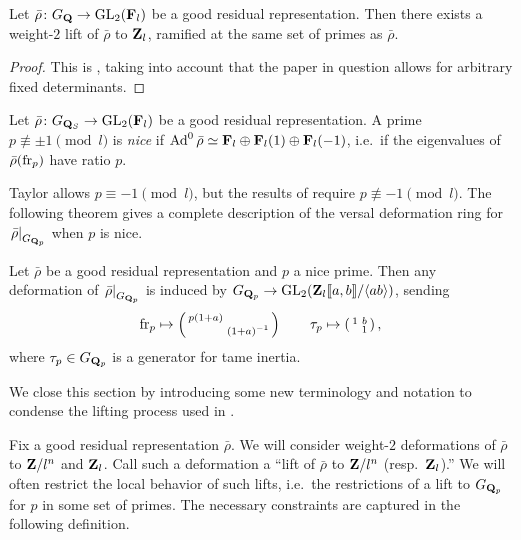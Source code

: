 \begin{theorem}\label{thm:always-can-lift}
Let $\bar\rho\colon G_{\mathbf{Q}} \to \operatorname{GL}_2(\mathbf{F}_l)$ be a good residual 
representation. Then there exists a weight-$2$ lift of $\bar\rho$ to $\mathbf{Z}_l$, 
ramified at the same set of primes as $\bar\rho$. 
\end{theorem}
\begin{proof}
This is \cite[Th.~1]{ramakrishna-2002}, taking into account that the paper in 
question allows for arbitrary fixed determinants. 
\end{proof}

\begin{definition}
Let $\bar\rho\colon G_{\mathbf{Q}_S} \to \operatorname{GL}_2(\mathbf{F}_l)$ be a good residual 
representation. A prime $p\not\equiv \pm 1\pmod l$ is \emph{nice} if 
$\operatorname{Ad}^0\bar\rho\simeq \mathbf{F}_l \oplus \mathbf{F}_l(1)\oplus \mathbf{F}_l(-1)$, i.e.~if the 
eigenvalues of $\bar\rho(\mathrm{fr}_p)$ have ratio $p$. 
\end{definition}

Taylor allows $p\equiv -1\pmod l$, but the results of \cite{pande-2011} 
require $p\not\equiv -1\pmod l$. The following theorem gives a complete 
description of the versal deformation ring for 
$\left.\bar\rho\right|_{G_{\mathbf{Q}_p}}$ when $p$ is nice.

\begin{theorem}
Let $\bar\rho$ be a good residual representation and $p$ a nice prime. Then 
any deformation of $\left.\bar\rho\right|_{G_{\mathbf{Q}_p}}$ is induced by 
$G_{\mathbf{Q}_p} \to \operatorname{GL}_2(\mathbf{Z}_l\llbracket a,b\rrbracket / \langle a b\rangle)$, sending 
\[
	\mathrm{fr}_p \mapsto \left(\begin{smallmatrix} p(1+a) &  \\  & (1+a)^{-1} \end{smallmatrix}\right) \qquad \tau_p \mapsto \left(\begin{smallmatrix} 1 & b \\  & 1 \end{smallmatrix}\right) ,
\]
where $\tau_p\in G_{\mathbf{Q}_p}$ is a generator for tame inertia. 
\end{theorem}

We close this section by introducing some new terminology and notation to 
condense the lifting process used in \cite{khare-larsen-ramakrishna-2005}. 

Fix a good residual representation $\bar\rho$. We will consider weight-$2$ 
deformations of $\bar\rho$ to $\mathbf{Z}/l^n$ and $\mathbf{Z}_l$. Call such a deformation a 
``lift of $\bar\rho$ to $\mathbf{Z}/l^n$ (resp.~$\mathbf{Z}_l$).'' We will often restrict the 
local behavior of such lifts, i.e.~the restrictions of a lift to $G_{\mathbf{Q}_p}$ 
for $p$ in some set of primes. The necessary constraints are captured in the 
following definition. 

